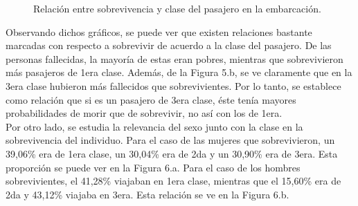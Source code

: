 \documentclass[letter, 10pt]{article}
\begin{document}
\begin{figure}[H]
\caption{Relación entre sobrevivencia y clase del pasajero en la embarcación.}
\end{figure}

Observando dichos gráficos, se puede ver que existen relaciones bastante marcadas con respecto a sobrevivir de acuerdo a la clase del pasajero. De las personas fallecidas, la mayoría de estas eran pobres, mientras que sobrevivieron más pasajeros de 1era clase. Además, de la Figura 5.b, se ve claramente que en la 3era clase hubieron más fallecidos que sobrevivientes. Por lo tanto, se establece como relación que si es un pasajero de 3era clase, éste tenía mayores probabilidades de morir que de sobrevivir, no así con los de 1era.\\

Por otro lado, se estudia la relevancia del sexo junto con la clase en la sobrevivencia del individuo. Para el caso de las mujeres que sobrevivieron, un 39,06\% era de 1era clase, un 30,04\% era de 2da y un 30,90\% era de 3era. Esta proporción se puede ver en la Figura 6.a. Para el caso de los hombres sobrevivientes, el 41,28\% viajaban en 1era clase, mientras que el 15,60\% era de 2da y 43,12\% viajaba en 3era. Esta relación se ve en la Figura 6.b.
\end{document}
